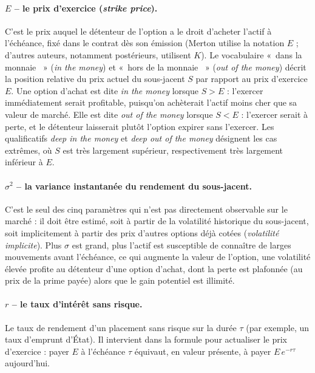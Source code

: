 \documentclass{article}
\providecommand{\og}{«~}
\providecommand{\fg}{~»}
\begin{document}
\paragraph{$E$ -- le prix d'exercice (\emph{strike price}).} C'est le prix auquel le détenteur de l'option a le droit d'acheter l'actif à l'échéance, fixé dans le contrat dès son émission (Merton utilise la notation $E$ ; d'autres auteurs, notamment postérieurs, utilisent $K$).
Le vocabulaire \og dans la monnaie \fg{} (\emph{in the money}) et \og hors de la monnaie \fg{} (\emph{out of the money}) décrit la position relative du prix actuel du sous-jacent $S$ par rapport au prix d'exercice $E$. Une option d'achat est dite \emph{in the money} lorsque $S>E$ : l'exercer immédiatement serait profitable, puisqu'on achèterait l'actif moins cher que sa valeur de marché. Elle est dite \emph{out of the money} lorsque $S<E$ : l'exercer serait à perte, et le détenteur laisserait plutôt l'option expirer sans l'exercer. Les qualificatifs \emph{deep in the money} et \emph{deep out of the money} désignent les cas extrêmes, où $S$ est très largement supérieur, respectivement très largement inférieur à $E$.
\paragraph{$\sigma^2$ -- la variance instantanée du rendement du sous-jacent.} C'est le seul des cinq paramètres qui n'est pas directement observable sur le marché : il doit être estimé, soit à partir de la volatilité historique du sous-jacent, soit implicitement à partir des prix d'autres options déjà cotées (\emph{volatilité implicite}). Plus $\sigma$ est grand, plus l'actif est susceptible de connaître de larges mouvements avant l'échéance, ce qui augmente la valeur de l'option, une volatilité élevée profite au détenteur d'une option d'achat, dont la perte est plafonnée (au prix de la prime payée) alors que le gain potentiel est illimité.
\paragraph{$r$ -- le taux d'intérêt sans risque.} Le taux de rendement d'un placement sans risque sur la durée $\tau$ (par exemple, un taux d'emprunt d'État). Il intervient dans la formule pour actualiser le prix d'exercice : payer $E$ à l'échéance $\tau$ équivaut, en valeur présente, à payer $E\,e^{-r\tau}$ aujourd'hui.
\end{document}
